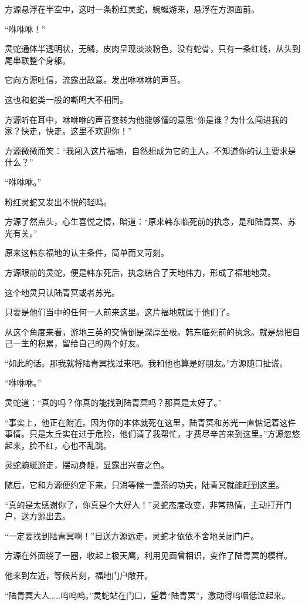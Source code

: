 \begin{this_body}
方源悬浮在半空中，这时一条粉红灵蛇，蜿蜒游来，悬浮在方源面前。

“咻咻咻！”

灵蛇通体半透明状，无鳞，皮肉呈现淡淡粉色，没有蛇骨，只有一条红线，从头到尾串联整个身躯。

它向方源吐信，流露出敌意。发出咻咻咻的声音。

这也和蛇类一般的嘶鸣大不相同。

方源听在耳中，咻咻咻的声音变转为他能够懂的意思“你是谁？为什么闯进我的家？快走，快走。这里不欢迎你！”

方源微微而笑：“我闯入这片福地，自然想成为它的主人。不知道你的认主要求是什么？”

“咻咻咻。”

粉红灵蛇又发出不悦的轻鸣。

方源了然点头，心生喜悦之情，暗道：“原来韩东临死前的执念，是和陆青冥、苏光有关。”

原来这韩东福地的认主条件，简单而又苛刻。

方源眼前的灵蛇，便是韩东死后，执念结合了天地伟力，形成了福地地灵。

这个地灵只认陆青冥或者苏光。

只要是他们当中的任何一人前来这里。这片福地就属于他们了。

从这个角度来看，游地三英的交情倒是深厚至极。韩东临死前的执念。就是想把自己一生的积累，留给自己的两个好友。

“如此的话。那我就将陆青冥找过来吧。我和他也算是好朋友。”方源随口扯谎。

“咻咻咻。”

灵蛇道：“真的吗？你真的能找到陆青冥吗？那真是太好了。”

“事实上，他正在附近。因为你的本体就死在这里，陆青冥和苏光一直惦记着这件事情。只是太丘实在过于危险，他们请了我帮忙，才费尽辛苦来到这里。”方源忽悠起来，脸不红，心也不乱跳。

灵蛇蜿蜒游走，摆动身躯，显露出兴奋之色。

随后，它和方源便约定下来，只消等候一盏茶的功夫，陆青冥就能赶到这里。

“真的是太感谢你了，你真是个大好人！”灵蛇态度改变，非常热情，主动打开门户，送方源出去。

“一定要找到陆青冥啊！”目送方源远走，灵蛇才依依不舍地关闭门户。

方源在外面绕了一圈，收起上极天鹰，利用见面曾相识，变作了陆青冥的模样。

他来到左近，等候片刻，福地门户敞开。

“陆青冥大人……呜呜呜。”灵蛇站在门口，望着“陆青冥”，激动得呜咽低泣起来。


\end{this_body}
